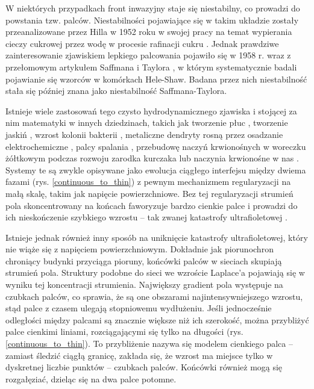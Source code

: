 \documentclass[]{pracamgr}
\begin{document}
      W niektórych przypadkach front inwazyjny staje się niestabilny, co prowadzi do powstania tzw. palców. Niestabilności pojawiające się w takim układzie zostały przeanalizowane przez Hilla w 1952 roku w swojej pracy na temat wypierania cieczy cukrowej przez wodę w procesie rafinacji cukru \cite{hill1952channeling}. Jednak prawdziwe zainteresowanie zjawiskiem lepkiego palcowania pojawiło się w 1958 r. wraz z przełomowym artykułem Saffmana i Taylora \cite{saffman1958penetration}, w którym systematycznie badali pojawianie się wzorców w komórkach Hele-Shaw. Badana przez nich niestabilność stała się później znana jako niestabilność Saffmana-Taylora.

      Istnieje wiele zastosowań tego czysto hydrodynamicznego zjawiska i stojącej za nim matematyki w innych dziedzinach, takich jak tworzenie płuc \cite{clement2012branching,lubkin1995mechanism}, tworzenie jaskiń \cite{szymczak2011initial}, wzrost kolonii bakterii \cite{matsushita1990diffusion}, metaliczne dendryty rosną przez osadzanie elektrochemiczne \cite{brady1984fractal}, palcy spalania \cite{zik1999fingering}, przebudowę naczyń krwionośnych w woreczku żółtkowym podczas rozwoju zarodka kurczaka \cite{nguyen2006dynamics} lub naczynia krwionośne w nas \cite{schneider2012tissue}. Systemy te są zwykle opisywane jako ewolucja ciągłego interfejsu między dwiema fazami (rys. \ref{continuous_to_thin}) z pewnym mechanizmem regularyzacji na małą skalę, takim jak napięcie powierzchniowe. Bez tej regularyzacji strumień pola skoncentrowany na końcach faworyzuje bardzo cienkie palce i prowadzi do ich nieskończenie szybkiego wzrostu -- tak zwanej katastrofy ultrafioletowej \cite{shraiman1988singularities}.

      Istnieje jednak również inny sposób na uniknięcie katastrofy ultrafioletowej, który nie wiąże się z napięciem powierzchniowym. Dokładnie jak piorunochron chroniący budynki przyciąga pioruny, końcówki palców w sieciach skupiają strumień pola. Struktury podobne do sieci we wzroście Laplace'a pojawiają się w wyniku tej koncentracji strumienia. Największy gradient pola występuje na czubkach palców, co sprawia, że są one obszarami najintensywniejszego wzrostu, stąd palce z czasem ulegają stopniowemu wydłużeniu. Jeśli jednocześnie odległości między palcami są znacznie większe niż ich szerokość, można przybliżyć palce cienkimi liniami, rozciągającymi się tylko na długości \cite{peterson1998singular,carleson2002laplacian,gubiec2008fingered} (rys. \ref{continuous_to_thin}). To przybliżenie nazywa się modelem cienkiego palca -- zamiast śledzić ciągłą granicę, zakłada się, że wzrost ma miejsce tylko w dyskretnej liczbie punktów -- czubkach palców. Końcówki również mogą się rozgałęziać, dzieląc się na dwa palce potomne.
\end{document}
